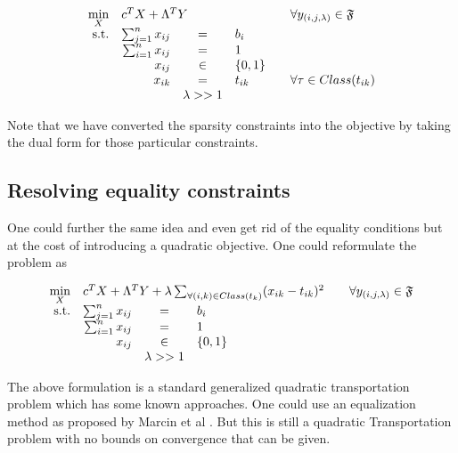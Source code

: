 \documentclass[a4paper]{article}
\begin{document}
        \begin{equation}
        \begin{array}{rrclcl}
        \displaystyle \min_{X} & \multicolumn{3}{l}{c^T X + \Lambda^TY } & &\forall {y_{(i,j,\lambda)}}\in \mathfrak{F}\\
        \textrm{s.t.} & \sum_{j=1}^n x_{ij}  & = & b_{i} \\
        & \sum_{i=1}^n x_{ij}  & = & 1 \\
        & x_{ij} & \in &\{0,1\} \\
        & x_{ik} &= & t_{ik} && \forall {\tau}\in Class(t_{ik}) \\
        && \lambda >> 1
        \end{array}
        \end{equation}
        
    Note that we have converted the sparsity constraints into the objective by taking the dual form for those particular constraints.
    
    \subsection{Resolving equality constraints}
    One could further the same idea and even get rid of the equality conditions but at the cost of introducing a quadratic objective.
    One could reformulate the problem as
    
    \begin{equation}
        \begin{array}{rrclcl}
        \displaystyle \min_{X} & \multicolumn{3}{l}{c^T X + \Lambda^TY + 
        \lambda\sum_{\forall(i,k) \in Class(t_{k})}(x_{ik}-t_{ik})^2
        } & &\forall {y_{(i,j,\lambda)}}\in \mathfrak{F}\\
        \textrm{s.t.} & \sum_{j=1}^n x_{ij}  & = & b_{i} \\
        & \sum_{i=1}^n x_{ij}  & = & 1 \\
        & x_{ij} & \in &\{0,1\} \\
        && \lambda >> 1
        \end{array}
        \end{equation}
        
    The above formulation is a standard generalized quadratic transportation problem which has some known approaches. One could use an equalization method as proposed by Marcin et al .\cite{Anholcer2015TheNG}
    But this is still a quadratic Transportation problem with no bounds on convergence that can be given.
    
\end{document}
